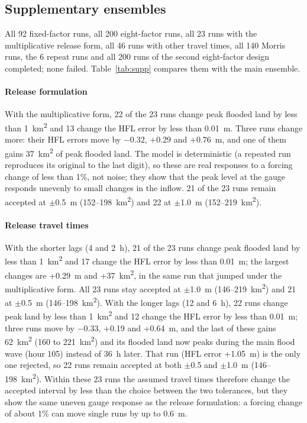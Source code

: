\documentclass[preprint,12pt,authoryear]{elsarticle}
\newcommand{\kmsq}{km\textsuperscript{2}}
\begin{document}
\subsection{Supplementary ensembles}
\label{sec:fixed}
All 92 fixed-factor runs, all 200 eight-factor runs, all 23 runs with the multiplicative release form, all 46 runs with other travel times, all 140 Morris runs, the 6 repeat runs and all 200 runs of the second eight-factor design completed; none failed. Table~\ref{tab:supp} compares them with the main ensemble.

\paragraph{Release formulation} With the multiplicative form, 22 of the 23 runs change peak flooded land by less than 1~\kmsq{} and 13 change the HFL error by less than 0.01~m. Three runs change more: their HFL errors move by $-0.32$, $+0.29$ and $+0.76$~m, and one of them gains 37~\kmsq{} of peak flooded land. The model is deterministic (a repeated run reproduces its original to the last digit), so these are real responses to a forcing change of less than 1\%, not noise; they show that the peak level at the gauge responds unevenly to small changes in the inflow. 21 of the 23 runs remain accepted at $\pm$0.5~m (152--198~\kmsq) and 22 at $\pm$1.0~m (152--219~\kmsq).

\paragraph{Release travel times} With the shorter lags (4 and 2~h), 21 of the 23 runs change peak flooded land by less than 1~\kmsq{} and 17 change the HFL error by less than 0.01~m; the largest changes are +0.29~m and +37~\kmsq, in the same run that jumped under the multiplicative form. All 23 runs stay accepted at $\pm$1.0~m (146--219~\kmsq) and 21 at $\pm$0.5~m (146--198~\kmsq). With the longer lags (12 and 6~h), 22 runs change peak land by less than 1~\kmsq{} and 12 change the HFL error by less than 0.01~m; three runs move by $-0.33$, +0.19 and +0.64~m, and the last of these gains 62~\kmsq{} (160 to 221~\kmsq) and its flooded land now peaks during the main flood wave (hour 105) instead of 36~h later. That run (HFL error +1.05~m) is the only one rejected, so 22 runs remain accepted at both $\pm$0.5 and $\pm$1.0~m (146--198~\kmsq). Within these 23 runs the assumed travel times therefore change the accepted interval by less than the choice between the two tolerances, but they show the same uneven gauge response as the release formulation: a forcing change of about 1\% can move single runs by up to 0.6~m.
\end{document}

